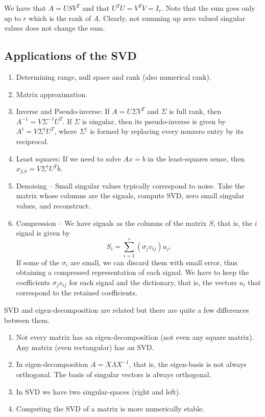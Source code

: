 \documentclass{article}
\begin{document}
We have that $A = USV^T$ and that $U^{T}U = V^{T}V = I_r$. Note that the sum goes only up to $r$ which is the rank of $A$. Clearly, not summing up zero valued singular values does not change the sum.

\subsection*{Applications of the SVD}
\begin{enumerate}
\item Determining range, null space and rank (also numerical rank).
\item Matrix approximation.
\item Inverse and Pseudo-inverse: If $A=U \Sigma V^{T}$ and $\Sigma$
is full rank, then $A^{-1}=V \Sigma^{-1} U^{T}$. If $\Sigma$ is
singular, then its pseudo-inverse is given by $A^{\dagger}=V
\Sigma^{\dagger} U^{T}$, where $\Sigma^{\dagger}$ is formed by
replacing every nonzero entry by its reciprocal.
\item Least squares: If we need to solve $Ax=b$ in the least-squares
sense, then $x_{LS}=V \Sigma^{\dagger} U^{T} b$.
\item Denoising -- Small singular values typically correspond to
noise. Take the matrix whose columns are the signals, compute SVD,
zero small singular values, and reconstruct.
\item Compression -- We have signals as the columns of the matrix
$S$, that is, the $i$ signal is given by
\begin{equation*}
S_{i} = \sum_{i=1}^{r} \left ( \sigma_{j} v_{ij} \right ) u_{j}.
\end{equation*}
If some of the $\sigma_{i}$ are small, we can discard them with
small error, thus obtaining a compressed representation of each
signal. We have to keep the coefficients $\sigma_{j} v_{ij}$ for
each signal and the dictionary, that is, the vectors $u_{i}$ that
correspond to the retained coefficients.
\end{enumerate}

\noindent SVD and eigen-decomposition are related but there are quite a few differences between them.
\begin{enumerate}
\item Not every matrix has an eigen-decomposition (not even any
square matrix).  Any matrix (even rectangular) has an SVD.
\item In eigen-decomposition $A=X \Lambda X^{-1}$, that is, the
eigen-basis is not always orthogonal. The basis of singular vectors
is always orthogonal.
\item In SVD we have two singular-spaces (right and left).
\item Computing the SVD of a matrix is more numerically stable.
\end{enumerate}
\end{document}
